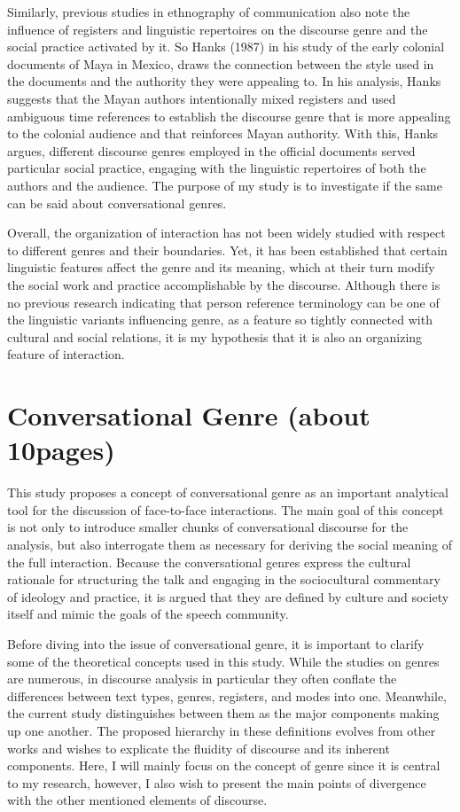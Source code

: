 \documentclass[12pt]{turabian-researchpaper}
\begin{document}
Similarly, previous studies in ethnography of communication also note the influence of registers and linguistic repertoires on the discourse genre and the social practice activated by it. So Hanks (1987) in his study of the early colonial documents of Maya in Mexico, draws the connection between the style used in the documents and the authority they were appealing to. In his analysis, Hanks suggests that the Mayan authors intentionally mixed registers and used ambiguous time references to establish the discourse genre that is more appealing to the colonial audience and that reinforces Mayan authority. With this, Hanks argues, different discourse genres employed in the official documents served particular social practice, engaging with the linguistic repertoires of both the authors and the audience. The purpose of my study is to investigate if the same can be said about conversational genres.

Overall, the organization of interaction has not been widely studied with respect to different genres and their boundaries. Yet, it has been established that certain linguistic features affect the genre and its meaning, which at their turn modify the social work and practice accomplishable by the discourse. Although there is no previous research indicating that person reference terminology can be one of the linguistic variants influencing genre, as a feature so tightly connected with cultural and social relations, it is my hypothesis that it is also an organizing feature of interaction.


\section{Conversational Genre (about 10pages)}
This study proposes a concept of conversational genre as an important analytical tool for the discussion of face-to-face interactions. The main goal of this concept is not only to introduce smaller chunks of conversational discourse for the analysis, but also interrogate them as necessary for deriving the social meaning of the full interaction. Because the conversational genres express the cultural rationale for structuring the talk and engaging in the sociocultural commentary of ideology and practice, it is argued that they are defined by culture and society itself and mimic the goals of the speech community. 

Before diving into the issue of conversational genre, it is important to clarify some of the theoretical concepts used in this study. While the studies on genres are numerous, in discourse analysis in particular they often conflate the differences between text types, genres, registers, and modes into one. Meanwhile, the current study distinguishes between them as the major components making up one another. The proposed hierarchy in these definitions evolves from other works and wishes to explicate the fluidity of discourse and its inherent components. Here, I will mainly focus on the concept of genre since it is central to my research, however, I also wish to present the main points of divergence with the other mentioned elements of discourse. 
\end{document}
